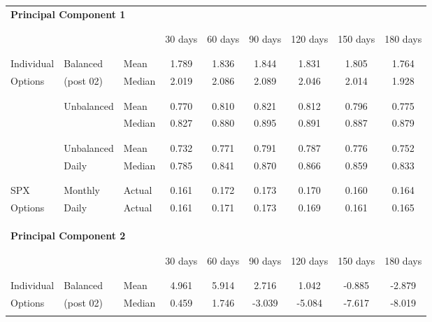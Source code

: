 \begin{tabular}{lllcccccc}
\multicolumn{9}{l}{\textbf{Principal Component 1}} \\ \\[-1.8ex] 
\hline \\[-1.8ex] 
 &  &  & 30 days & 60 days & 90 days & 120 days & 150 days & 180 days \\ \\[-1.8ex] 
\hline \\[-1.8ex] 
Individual & Balanced & Mean & 1.789 & 1.836 & 1.844 & 1.831 & 1.805 & 1.764 \\
Options & (post 02) & Median & 2.019 & 2.086 & 2.089 & 2.046 & 2.014 & 1.928 \\ \\[-1.8ex]
\cline{2-9} \\[-1.8ex] 
 & Unbalanced & Mean & 0.770 & 0.810 & 0.821 & 0.812 & 0.796 & 0.775 \\
 &  & Median & 0.827 & 0.880 & 0.895 & 0.891 & 0.887 & 0.879 \\ \\[-1.8ex]
\cline{2-9} \\[-1.8ex] 
 & Unbalanced & Mean & 0.732 & 0.771 & 0.791 & 0.787 & 0.776 & 0.752 \\
 & Daily & Median & 0.785 & 0.841 & 0.870 & 0.866 & 0.859 & 0.833 \\ \\[-1.8ex]
\hline \\[-1.8ex] 
SPX & Monthly & Actual & 0.161 & 0.172 & 0.173 & 0.170 & 0.160 & 0.164 \\
Options & Daily & Actual & 0.161 & 0.171 & 0.173 & 0.169 & 0.161 & 0.165 \\ \\[-1.8ex]
\hline \\[-1.8ex] 
\\[-0.8ex] 
\multicolumn{9}{l}{\textbf{Principal Component 2}} \\ \\[-1.8ex] 
\hline \\[-1.8ex] 
 &  &  & 30 days & 60 days & 90 days & 120 days & 150 days & 180 days \\ \\[-1.8ex] 
\hline \\[-1.8ex] 
Individual & Balanced & Mean & 4.961 & 5.914 & 2.716 & 1.042 & -0.885 & -2.879 \\
Options & (post 02) & Median & 0.459 & 1.746 & -3.039 & -5.084 & -7.617 & -8.019 \\ \\[-1.8ex]

\end{tabular}
